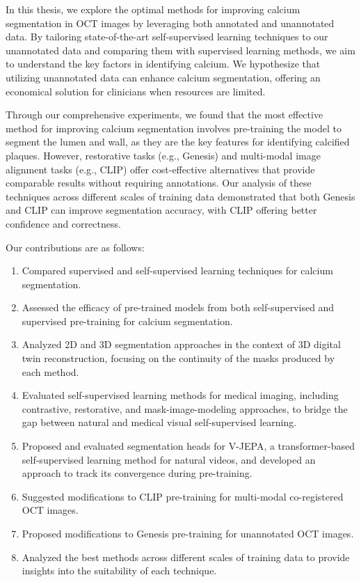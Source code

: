 \documentclass[a4paper,11pt,oneside]{report}
\begin{document}
In this thesis, we explore the optimal methods for improving calcium segmentation in OCT images by leveraging both annotated and unannotated data. By tailoring state-of-the-art self-supervised learning techniques to our unannotated data and comparing them with supervised learning methods, we aim to understand the key factors in identifying calcium. 
We hypothesize that utilizing unannotated data can enhance calcium segmentation, offering an economical solution for clinicians when resources are limited.

Through our comprehensive experiments, we found that the most effective method for improving calcium segmentation involves pre-training the model to segment the lumen and wall, as they are the key features for identifying calcified plaques. However, restorative tasks (e.g., Genesis) and multi-modal image alignment tasks (e.g., CLIP) offer cost-effective alternatives that provide comparable results without requiring annotations. Our analysis of these techniques across different scales of training data demonstrated that both Genesis and CLIP can improve segmentation accuracy, with CLIP offering better confidence and correctness.

Our contributions are as follows:
\begin{enumerate}
    \item Compared supervised and self-supervised learning techniques for calcium segmentation.
    \item Assessed the efficacy of pre-trained models from both self-supervised and supervised pre-training for calcium segmentation. 
    \item Analyzed 2D and 3D segmentation approaches in the context of 3D digital twin reconstruction, focusing on the continuity of the masks produced by each method.
    \item Evaluated self-supervised learning methods for medical imaging, including contrastive, restorative, and mask-image-modeling approaches, to bridge the gap between natural and medical visual self-supervised learning.
    \item Proposed and evaluated segmentation heads for V-JEPA, a transformer-based self-supervised learning method for natural videos, and developed an approach to track its convergence during pre-training.
    \item Suggested modifications to CLIP pre-training for multi-modal co-registered OCT images.
    \item Proposed modifications to Genesis pre-training for unannotated OCT images. 
    \item Analyzed the best methods across different scales of training data to provide insights into the suitability of each technique.
\end{enumerate}
\end{document}
